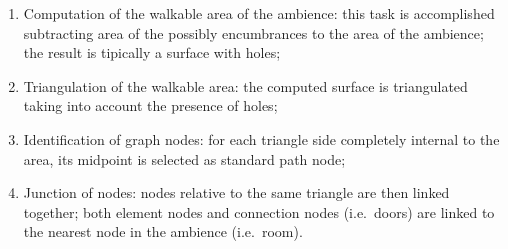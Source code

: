 \documentclass{sig-alternate}
\begin{document}
\begin{enumerate}
\def\labelenumi{\arabic{enumi}.}
\itemsep1pt\parskip0pt
\item
  Computation of the walkable area of the ambience: this task is
  accomplished subtracting area of the possibly encumbrances to the area
  of the ambience; the result is tipically a surface with holes;
\item
  Triangulation of the walkable area: the computed surface is
  triangulated taking into account the presence of holes;
\item
  Identification of graph nodes: for each triangle side completely
  internal to the area, its midpoint is selected as standard path node;
\item
  Junction of nodes: nodes relative to the same triangle are then linked
  together; both element nodes and connection nodes (i.e.~doors) are
  linked to the nearest node in the ambience (i.e.~room).
\end{enumerate}
\end{document}
